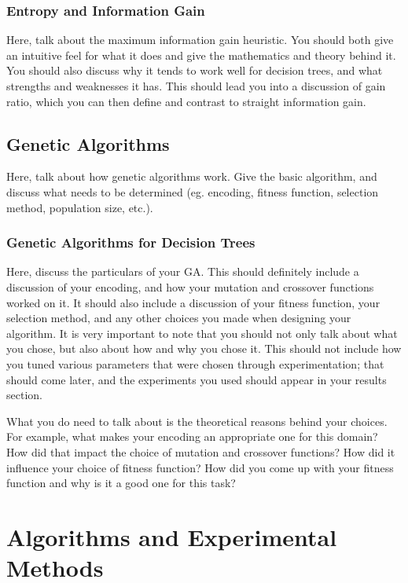 \documentclass[12pt, letterpaper]{article}
\begin{document}
\subsubsection*{Entropy and Information Gain}
Here, talk about the maximum information gain heuristic.  You should both give
an intuitive feel for what it does and give the mathematics and theory behind
it.  You should also discuss why it tends to work well for decision trees, and
what strengths and weaknesses it has.  This should lead you into a discussion of
gain ratio, which you can then define and contrast to straight information gain.

\subsection{Genetic Algorithms}
Here, talk about how genetic algorithms work.  Give the basic algorithm, and
discuss what needs to be determined (eg. encoding, fitness function, selection
method, population size, etc.).

\subsubsection*{Genetic Algorithms for Decision Trees}
Here, discuss the particulars of your GA.  This should definitely include a
discussion of your encoding, and how your mutation and crossover functions
worked on it.  It should also include a discussion of your fitness function,
your selection method, and any other choices you made when designing your
algorithm.  It is very important to note that you should not only talk about
what you chose, but also about how and why you chose it.  This should not
include how you tuned various parameters that were chosen through
experimentation; that should come later, and the experiments you used should
appear in your results section.

What you do need to talk about is the theoretical reasons behind your choices.
For example, what makes your encoding an appropriate one for this domain?  How
did that impact the choice of mutation and crossover functions?  How did it
influence your choice of fitness function?  How did you come up with your
fitness function and why is it a good one for this task? 

\section{Algorithms and Experimental Methods}
\end{document}

